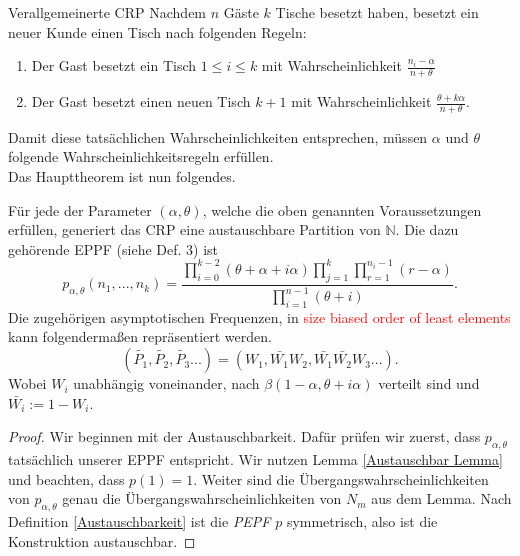 \begin{section}{Verallgemeinerte CRP}
Nachdem $n$ Gäste $k$ Tische besetzt haben, besetzt ein neuer Kunde einen Tisch nach folgenden Regeln:
\begin{enumerate}
    \item Der Gast besetzt ein Tisch $1 \leq i \leq k$ mit Wahrscheinlichkeit $\frac{n_i-\alpha}{n + \theta}$ 
    \item Der Gast besetzt einen neuen Tisch $k+1$ mit Wahrscheinlichkeit $\frac{\theta + k\alpha}{n + \theta}$.
\end{enumerate}
Damit diese tatsächlichen Wahrscheinlichkeiten entsprechen, müssen $\alpha$ und $\theta$ folgende Wahrscheinlichkeitsregeln erfüllen. \\
Das Haupttheorem ist nun folgendes.
\begin{theorem}
    Für jede der Parameter $(\alpha,\theta)$, welche die oben genannten Voraussetzungen erfüllen, generiert das CRP eine austauschbare  Partition von $\mathbb{N}$. Die dazu gehörende EPPF (siehe Def. 3) ist 
    \begin{equation}
   p_{\alpha,\theta}(n_1,...,n_k) = \frac{\displaystyle \prod_{i=0}^{k-2}(\theta + \alpha + i\alpha)\prod_{j=1}^{k}\prod_{r=1}^{n_i-1}(r-\alpha)}{\displaystyle\prod_{i=1}^{n-1}(\theta  + i)}.
    \end{equation}
    Die zugehörigen asymptotischen Frequenzen, in \textcolor{red}{size biased order of least elements} kann folgendermaßen repräsentiert werden.
    \[
    (\tilde{P_1},\tilde{P_2},\tilde{P_3}...) = (W_1,\bar{W_1}W_2,\bar{W_1}\bar{W_2}W_3...).
    \]
    Wobei $W_i$ unabhängig voneinander, nach $\beta(1 - \alpha, \theta + i\alpha)$ verteilt sind und $\bar{W_i}:= 1 - W_i$.
\end{theorem}  
\begin{proof}
   Wir beginnen mit der Austauschbarkeit. Dafür prüfen wir zuerst, dass $p_{\alpha,\theta}$ tatsächlich unserer EPPF entspricht. Wir nutzen Lemma \ref{Austauschbar Lemma} und beachten, dass $p(1) = 1$. Weiter sind die Übergangswahrscheinlichkeiten von $p_{\alpha,\theta}$ genau die Übergangswahrscheinlichkeiten von $N_m$ aus dem Lemma. Nach Definition \ref{Austauschbarkeit} ist die \textit{PEPF} $p$ symmetrisch, also ist die Konstruktion austauschbar.
\end{proof}

\end{section}
